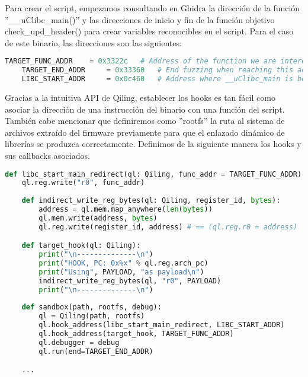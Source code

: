 Para crear el script, empezamos consultando en Ghidra la dirección de la función ''\_\_uClibc\_main()'' y las direcciones de 
inicio y fin de la función objetivo check\_upd\_header() para crear variables reconocibles en el script. Para el caso de este 
binario, las direcciones son las siguientes:

\begin{lstlisting}[language=python, caption=Declaración de constantes: Direcciones de interés en funciones., captionpos=b,
     frame=single, breaklines]
    TARGET_FUNC_ADDR    = 0x3322c   # Address of the function we are interested in
    TARGET_END_ADDR     = 0x33360   # End fuzzing when reaching this address
    LIBC_START_ADDR     = 0x0c460   # Address where __uClibc_main is being called
\end{lstlisting}

Gracias a la intuitiva API de Qiling, establecer los hooks es tan fácil como asociar la dirección de una instrucción del binario
con una función del script. También cabe mencionar que definiremos como ''rootfs'' la ruta al sistema de archivos extraído del
firmware previamente para que el enlazado dinámico de librerías se produzca correctamente. Definimos de la siguiente manera los
hooks y sus callbacks asociados.

\begin{lstlisting}[language=python, caption=Definición de hooks del script de emulación para Qiling., captionpos=b,
    frame=single, breaklines]
    def libc_start_main_redirect(ql: Qiling, func_addr = TARGET_FUNC_ADDR):
    ql.reg.write("r0", func_addr)
    
    def indirect_write_reg_bytes(ql: Qiling, register_id, bytes):
        address = ql.mem.map_anywhere(len(bytes))
        ql.mem.write(address, bytes)
        ql.reg.write(register_id, address) # == (ql.reg.r0 = address) 

    def target_hook(ql: Qiling):    
        print("\n--------------\n")
        print("HOOK, PC: 0x%x" % ql.reg.arch_pc)
        print("Using", PAYLOAD, "as payload\n")
        indirect_write_reg_bytes(ql, "r0", PAYLOAD)
        print("\n--------------\n")
        
    def sandbox(path, rootfs, debug):    
        ql = Qiling(path, rootfs)
        ql.hook_address(libc_start_main_redirect, LIBC_START_ADDR)
        ql.hook_address(target_hook, TARGET_FUNC_ADDR)     
        ql.debugger = debug
        ql.run(end=TARGET_END_ADDR)

    ...
\end{lstlisting}


